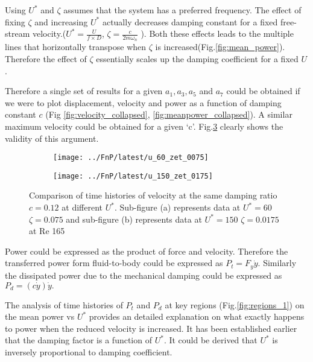  Using $U^*$ and $\zeta$ assumes that the system has a preferred frequency. The effect of fixing $\zeta$ and increasing $U^*$ actually decreases damping constant for a fixed free-stream velocity.($U^*=\frac{U}{f \times D}$, $\zeta= \frac{c}{2 m \omega_n}$ ). Both these effects leads to the multiple lines that horizontally transpose when $\zeta$ is increased(Fig.\ref{fig:mean_power}). Therefore the effect of $\zeta$ essentially scales up the damping coefficient for a fixed $U$. 
 \vspace{1cm}
 
 Therefore a single set of results for a given $a_1,a_3, a_5$ and $a_7$ could be obtained if we were to plot displacement, velocity and power as a function of damping constant $c$ (Fig \ref{fig:velocity_collapsed}, \ref{fig:meanpower_collapsed}). A similar maximum velocity could be obtained for a given `c'. Fig.\ref{fig:same_max_vel} clearly shows the validity of this argument. 


 
 \begin{figure}[h!]
 \begin{subfigure}[b]{0.5\textwidth}
 \centering
 \label{fig:u_60_zet_0075}
 \texttt{[image: ../FnP/latest/u\_60\_zet\_0075]}
 \caption{}
 \end{subfigure}
 
 \begin{subfigure}[b]{0.5\textwidth}
 \centering
 \label{fig:u_150_zet_017}
 \texttt{[image: ../FnP/latest/u\_150\_zet\_0175]}
 \caption{}
 \end{subfigure}
 \caption{Comparison of time histories of velocity at the same damping ratio $c=0.12$ at different $U^*$. Sub-figure (a) represents data at $U^*=60$ $\zeta=0.075$ and sub-figure (b) represents data at $U^*=150$ $\zeta=0.0175$ at Re 165 }
 \label{fig:same_max_vel}
 \end{figure}
 
 
 
 
 
 Power could be expressed as the product of force and velocity. Therefore the transferred power form fluid-to-body could be expressed as $P_t=F_y\dot{y}$. Similarly the dissipated power due to the mechanical damping could be expressed as $P_d=(c\dot{y})\dot{y}.$

The analysis of time histories of $P_t $ and $P_d$ at key regions (Fig.\ref{fig:regions_1}) on the mean power vs $U^*$ provides an detailed explanation on what exactly happens to power when the reduced velocity is increased. It has been established earlier that the damping factor is a function of $U^*$. It could be derived that $U^*$ is inversely proportional to damping coefficient. 

